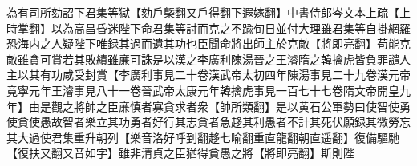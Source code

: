 為有司所劾詔下君集等獄【劾戶槩翻又戶得翻下遐嫁翻】中書侍郎岑文本上疏【上時掌翻】以為高昌昏迷陛下命君集等討而克之不踰旬日並付大理雖君集等自掛網羅恐海内之人疑陛下唯録其過而遺其功也臣聞命將出師主於克敵【將即亮翻】苟能克敵雖貪可賞若其敗績雖亷可誅是以漢之李廣利陳湯晉之王濬隋之韓擒虎皆負罪譴人主以其有功咸受封賞【李廣利事見二十卷漢武帝太初四年陳湯事見二十九卷漢元帝竟寧元年王濬事見八十一卷晉武帝太康元年韓擒虎事見一百七十七卷隋文帝開皇九年】由是觀之將帥之臣亷慎者寡貪求者衆【帥所類翻】是以黄石公軍勢曰使智使勇使貪使愚故智者樂立其功勇者好行其志貪者急趍其利愚者不計其死伏願録其微勞忘其大過使君集重升朝列【樂音洛好呼到翻趍七喻翻重直龍翻朝直遥翻】復備驅馳【復扶又翻又音如字】雖非清貞之臣猶得貪愚之將【將即亮翻】斯則陛